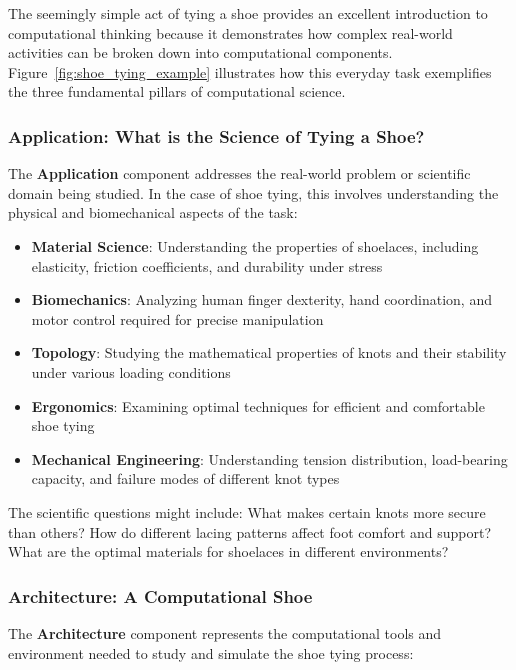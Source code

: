 The seemingly simple act of tying a shoe provides an excellent introduction to computational thinking because it demonstrates how complex real-world activities can be broken down into computational components. Figure~\ref{fig:shoe_tying_example} illustrates how this everyday task exemplifies the three fundamental pillars of computational science.

\subsubsection{Application: What is the Science of Tying a Shoe?}

The \textbf{Application} component addresses the real-world problem or scientific domain being studied. In the case of shoe tying, this involves understanding the physical and biomechanical aspects of the task:

\begin{itemize}
    \item \textbf{Material Science}: Understanding the properties of shoelaces, including elasticity, friction coefficients, and durability under stress
    \item \textbf{Biomechanics}: Analyzing human finger dexterity, hand coordination, and motor control required for precise manipulation
    \item \textbf{Topology}: Studying the mathematical properties of knots and their stability under various loading conditions
    \item \textbf{Ergonomics}: Examining optimal techniques for efficient and comfortable shoe tying
    \item \textbf{Mechanical Engineering}: Understanding tension distribution, load-bearing capacity, and failure modes of different knot types
\end{itemize}

The scientific questions might include: What makes certain knots more secure than others? How do different lacing patterns affect foot comfort and support? What are the optimal materials for shoelaces in different environments?

\subsubsection{Architecture: A Computational Shoe}

The \textbf{Architecture} component represents the computational tools and environment needed to study and simulate the shoe tying process:

